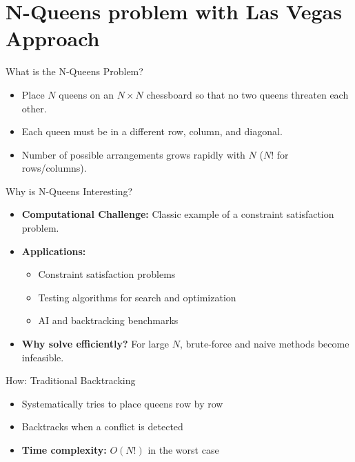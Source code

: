 \section{N-Queens problem with Las Vegas Approach}
\begin{frame}{What is the N-Queens Problem?}
  \begin{itemize}
    \item Place $N$ queens on an $N \times N$ chessboard so that no two queens threaten each other.
    \item Each queen must be in a different row, column, and diagonal.
    \item Number of possible arrangements grows rapidly with $N$ ($N!$ for rows/columns). \parencite{BELL20091}
  \end{itemize}
\end{frame}

\begin{frame}{Why is N-Queens Interesting?}
  \begin{itemize}
    \item \textbf{Computational Challenge:} Classic example of a constraint satisfaction problem. \parencite{motwani1995randomized}
    \item \textbf{Applications:}
          \begin{itemize}
            \item Constraint satisfaction problems
            \item Testing algorithms for search and optimization
            \item AI and backtracking benchmarks
          \end{itemize}
    \item \textbf{Why solve efficiently?} For large $N$, brute-force and naive methods become infeasible.
  \end{itemize}
\end{frame}

\begin{frame}[fragile]{How: Traditional Backtracking}
  \begin{itemize}
    \item Systematically tries to place queens row by row
    \item Backtracks when a conflict is detected
    \item \textbf{Time complexity:} $O(N!)$ in the worst case \parencite{motwani1995randomized}
  \end{itemize}
\end{frame}

